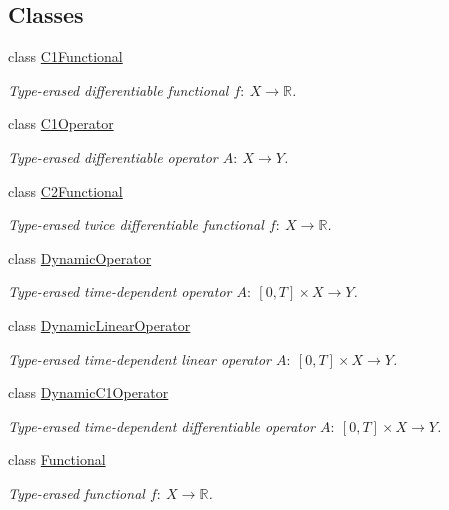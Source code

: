 \subsection*{\-Classes}
\begin{DoxyCompactItemize}
\item 
class \hyperlink{classSpacy_1_1C1Functional}{\-C1\-Functional}
\begin{DoxyCompactList}\small\item\em \-Type-\/erased differentiable functional $f:\ X \to \mathbb{R} $. \end{DoxyCompactList}\item 
class \hyperlink{classSpacy_1_1C1Operator}{\-C1\-Operator}
\begin{DoxyCompactList}\small\item\em \-Type-\/erased differentiable operator $A:\ X \to Y $. \end{DoxyCompactList}\item 
class \hyperlink{classSpacy_1_1C2Functional}{\-C2\-Functional}
\begin{DoxyCompactList}\small\item\em \-Type-\/erased twice differentiable functional $f:\ X \to \mathbb{R} $. \end{DoxyCompactList}\item 
class \hyperlink{classSpacy_1_1DynamicOperator}{\-Dynamic\-Operator}
\begin{DoxyCompactList}\small\item\em \-Type-\/erased time-\/dependent operator $A:\ [0,T] \times X \to Y $. \end{DoxyCompactList}\item 
class \hyperlink{classSpacy_1_1DynamicLinearOperator}{\-Dynamic\-Linear\-Operator}
\begin{DoxyCompactList}\small\item\em \-Type-\/erased time-\/dependent linear operator $A:\ [0,T] \times X \to Y $. \end{DoxyCompactList}\item 
class \hyperlink{classSpacy_1_1DynamicC1Operator}{\-Dynamic\-C1\-Operator}
\begin{DoxyCompactList}\small\item\em \-Type-\/erased time-\/dependent differentiable operator $A:\ [0,T] \times X \to Y $. \end{DoxyCompactList}\item 
class \hyperlink{classSpacy_1_1Functional}{\-Functional}
\begin{DoxyCompactList}\small\item\em \-Type-\/erased functional $f:\ X \to \mathbb{R} $. \end{DoxyCompactList}\item 

\end{DoxyCompactItemize}
